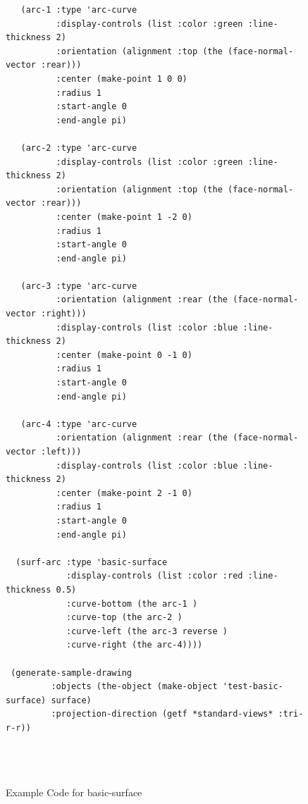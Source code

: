 \documentclass [11pt]{book}
\begin{document}
\begin{itemize}
\begin{figure}
\begin{lrbox}{\boxedverb}
\begin{minipage}{\linewidth}
{\begin{verbatim}
   (arc-1 :type 'arc-curve
          :display-controls (list :color :green :line-thickness 2)
          :orientation (alignment :top (the (face-normal-vector :rear)))
          :center (make-point 1 0 0)
          :radius 1
          :start-angle 0
          :end-angle pi)
 
   (arc-2 :type 'arc-curve
          :display-controls (list :color :green :line-thickness 2)
          :orientation (alignment :top (the (face-normal-vector :rear)))
          :center (make-point 1 -2 0)
          :radius 1
          :start-angle 0
          :end-angle pi)
   
   (arc-3 :type 'arc-curve
          :orientation (alignment :rear (the (face-normal-vector :right)))
          :display-controls (list :color :blue :line-thickness 2)
          :center (make-point 0 -1 0)
          :radius 1
          :start-angle 0
          :end-angle pi)
   
   (arc-4 :type 'arc-curve
          :orientation (alignment :rear (the (face-normal-vector :left)))
          :display-controls (list :color :blue :line-thickness 2)
          :center (make-point 2 -1 0)
          :radius 1
          :start-angle 0
          :end-angle pi)
   
  (surf-arc :type 'basic-surface
            :display-controls (list :color :red :line-thickness 0.5) 
            :curve-bottom (the arc-1 )
            :curve-top (the arc-2 )
            :curve-left (the arc-3 reverse )
            :curve-right (the arc-4))))

 (generate-sample-drawing 
	     :objects (the-object (make-object 'test-basic-surface) surface)
	     :projection-direction (getf *standard-views* :tri-r-r))


 
\end{verbatim}}
\end{minipage}
\end{lrbox}
\fbox{\usebox{\boxedverb}}

\caption{Example Code for basic-surface}

\label{fig:example-code-basic-surface}

\end{figure}


\end{itemize}
\end{document}
